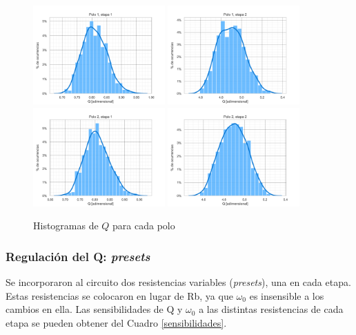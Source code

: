 \begin{figure}[H]
    \centering
    \includegraphics[width=0.45\textwidth]{../Ex3/Resources/histograma_q_poles_00.png}
    \includegraphics[width=0.45\textwidth]{../Ex3/Resources/histograma_q_poles_01.png}
    \includegraphics[width=0.45\textwidth]{../Ex3/Resources/histograma_q_poles_10.png}
    \includegraphics[width=0.45\textwidth]{../Ex3/Resources/histograma_q_poles_11.png}
    \caption{Histogramas de $Q$ para cada polo}
    \label{sedrahistq}
\end{figure}


\subsubsection{Regulación del Q: \emph{presets}}
Se incorporaron al circuito dos resistencias variables (\emph{presets}), una en cada etapa. Estas resistencias se colocaron en lugar de Rb, ya que $\omega_{0}$ es insensible a los cambios en ella. Las sensibilidades de Q y $\omega_{0}$ a las distintas resistencias de cada etapa se pueden obtener del Cuadro \ref{sensibilidades}.

